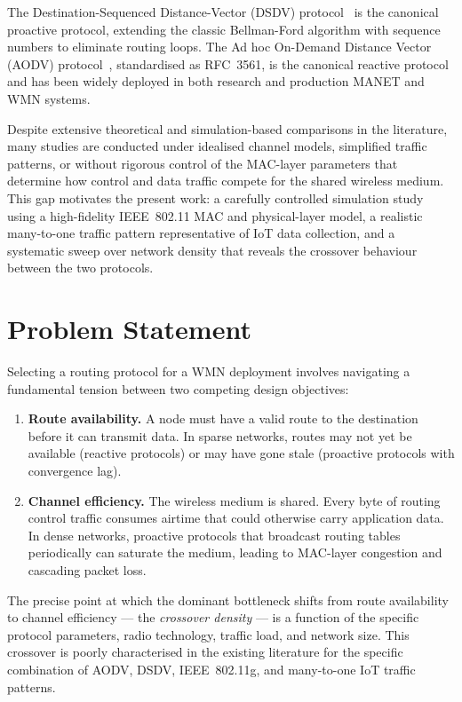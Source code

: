 The Destination-Sequenced Distance-Vector (DSDV) protocol~\cite{perkins1994dsdv} is the
canonical proactive protocol, extending the classic Bellman-Ford algorithm with sequence
numbers to eliminate routing loops. The Ad hoc On-Demand Distance Vector (AODV)
protocol~\cite{perkins2003aodv}, standardised as RFC~3561, is the canonical reactive
protocol and has been widely deployed in both research and production MANET and WMN systems.

Despite extensive theoretical and simulation-based comparisons in the literature, many
studies are conducted under idealised channel models, simplified traffic patterns, or
without rigorous control of the MAC-layer parameters that determine how control and data
traffic compete for the shared wireless medium. This gap motivates the present work: a
carefully controlled simulation study using a high-fidelity IEEE~802.11 MAC and
physical-layer model, a realistic many-to-one traffic pattern representative of IoT data
collection, and a systematic sweep over network density that reveals the crossover
behaviour between the two protocols.

\section{Problem Statement}

Selecting a routing protocol for a WMN deployment involves navigating a fundamental
tension between two competing design objectives:

\begin{enumerate}
  \item \textbf{Route availability.} A node must have a valid route to the destination
    before it can transmit data. In sparse networks, routes may not yet be available
    (reactive protocols) or may have gone stale (proactive protocols with convergence lag).
  \item \textbf{Channel efficiency.} The wireless medium is shared. Every byte of routing
    control traffic consumes airtime that could otherwise carry application data. In dense
    networks, proactive protocols that broadcast routing tables periodically can saturate
    the medium, leading to MAC-layer congestion and cascading packet loss.
\end{enumerate}

The precise point at which the dominant bottleneck shifts from route availability to
channel efficiency --- the \emph{crossover density} --- is a function of the specific
protocol parameters, radio technology, traffic load, and network size. This crossover is
poorly characterised in the existing literature for the specific combination of AODV,
DSDV, IEEE~802.11g, and many-to-one IoT traffic patterns.

